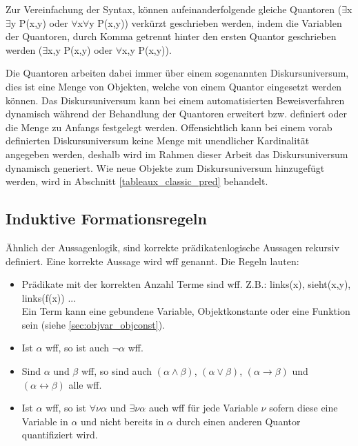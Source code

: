Zur Vereinfachung der Syntax, können aufeinanderfolgende gleiche Quantoren ($\exists$x$\exists$y P(x,y) oder $\forall$x$\forall$y P(x,y)) verkürzt geschrieben werden, indem die Variablen der Quantoren, durch Komma getrennt hinter den ersten Quantor geschrieben werden ($\exists$x,y P(x,y) oder $\forall$x,y P(x,y)). 

Die Quantoren arbeiten dabei immer über einem sogenannten Diskursuniversum, dies ist eine Menge von Objekten, welche von einem Quantor eingesetzt werden können. Das Diskursuniversum kann bei einem automatisierten Beweisverfahren dynamisch während der Behandlung der Quantoren erweitert bzw. definiert oder die Menge zu Anfangs festgelegt werden. Offensichtlich kann bei einem vorab definierten Diskursuniversum keine Menge mit unendlicher Kardinalität angegeben werden, deshalb wird im Rahmen dieser Arbeit das Diskursuniversum dynamisch generiert. Wie neue Objekte zum Diskursuniversum hinzugefügt werden, wird in Abschnitt \ref{tableaux_classic_pred} behandelt.

\subsection{Induktive Formationsregeln}
Ähnlich der Aussagenlogik, sind korrekte prädikatenlogische Aussagen rekursiv definiert. Eine korrekte Aussage wird \ac{wff} genannt. Die Regeln lauten:
\begin{itemize}
\item
Prädikate mit der korrekten Anzahl Terme sind \ac{wff}. Z.B.: links(x), sieht(x,y), links(f(x)) ... \\
Ein Term kann eine gebundene Variable, Objektkonstante oder eine Funktion sein (siehe \autoref{sec:objvar_objconst}).

\item
Ist $\alpha$ \ac{wff}, so ist auch $\neg\alpha$ \ac{wff}.

\item
Sind $\alpha$ und $\beta$ \ac{wff}, so sind auch $(\alpha\wedge\beta)$, $(\alpha\vee\beta)$, $(\alpha\rightarrow\beta)$ und $(\alpha\leftrightarrow\beta)$ alle \ac{wff}.

\item
Ist $\alpha$ \ac{wff}, so ist $\forall\nu\alpha$ und $\exists\nu\alpha$ auch \ac{wff} für jede Variable $\nu$ sofern diese eine Variable in $\alpha$ und nicht bereits in $\alpha$ durch einen anderen Quantor quantifiziert wird.
\end{itemize}

